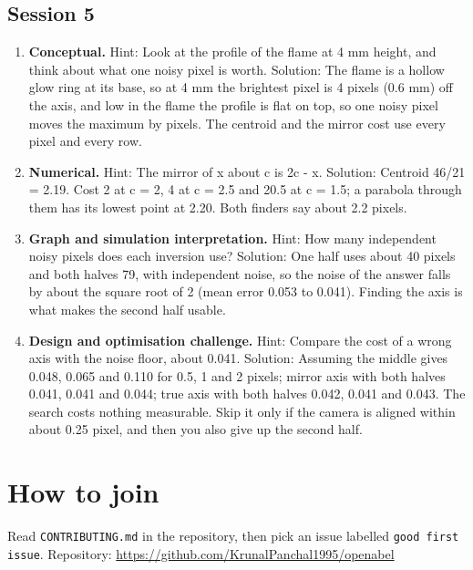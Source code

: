 \documentclass[11pt,a4paper]{article}
\begin{document}
\subsection*{Session 5}
\begin{enumerate}[nosep]
\item \textbf{Conceptual.} Hint: Look at the profile of the flame at 4 mm height, and think about what one noisy pixel is worth. Solution: The flame is a hollow glow ring at its base, so at 4 mm the brightest pixel is 4 pixels (0.6 mm) off the axis, and low in the flame the profile is flat on top, so one noisy pixel moves the maximum by pixels. The centroid and the mirror cost use every pixel and every row.
\item \textbf{Numerical.} Hint: The mirror of x about c is 2c - x. Solution: Centroid 46/21 = 2.19. Cost 2 at c = 2, 4 at c = 2.5 and 20.5 at c = 1.5; a parabola through them has its lowest point at 2.20. Both finders say about 2.2 pixels.
\item \textbf{Graph and simulation interpretation.} Hint: How many independent noisy pixels does each inversion use? Solution: One half uses about 40 pixels and both halves 79, with independent noise, so the noise of the answer falls by about the square root of 2 (mean error 0.053 to 0.041). Finding the axis is what makes the second half usable.
\item \textbf{Design and optimisation challenge.} Hint: Compare the cost of a wrong axis with the noise floor, about 0.041. Solution: Assuming the middle gives 0.048, 0.065 and 0.110 for 0.5, 1 and 2 pixels; mirror axis with both halves 0.041, 0.041 and 0.044; true axis with both halves 0.042, 0.041 and 0.043. The search costs nothing measurable. Skip it only if the camera is aligned within about 0.25 pixel, and then you also give up the second half.
\end{enumerate}

\section{How to join}
Read \texttt{CONTRIBUTING.md} in the repository, then pick an issue labelled \texttt{good first issue}. Repository: \url{https://github.com/KrunalPanchal1995/openabel}
\end{document}
